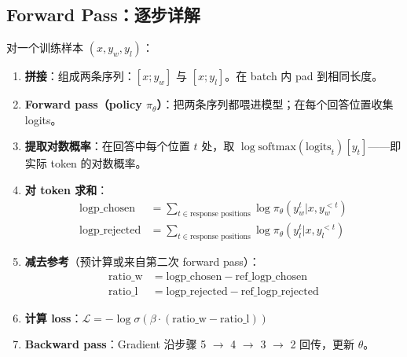 \subsection{Forward Pass：逐步详解}
\label{forward-pass-step-by-step}

对一个训练样本 $(x, y_w, y_l)$：

\begin{enumerate}
  \item \textbf{拼接}：组成两条序列：$[x; y_w]$ 与 $[x; y_l]$。在 batch 内 pad 到相同长度。
  \item \textbf{Forward pass（policy $\pi_\theta$）}：把两条序列都喂进模型；在每个回答位置收集 logits。
  \item \textbf{提取对数概率}：在回答中每个位置 $t$ 处，取 $\log\text{softmax}(\text{logits}_t)[y_t]$——即实际 token 的对数概率。
  \item \textbf{对 token 求和}：
\begin{align}
\text{logp\_chosen} &= \sum_{t \in \text{response positions}} \log\pi_\theta(y_w^t | x, y_w^{<t}) \\
\text{logp\_rejected} &= \sum_{t \in \text{response positions}} \log\pi_\theta(y_l^t | x, y_l^{<t})
\end{align}
  \item \textbf{减去参考}（预计算或来自第二次 forward pass）：
\begin{align}
\text{ratio\_w} &= \text{logp\_chosen} - \text{ref\_logp\_chosen} \\
\text{ratio\_l} &= \text{logp\_rejected} - \text{ref\_logp\_rejected}
\end{align}
  \item \textbf{计算 loss}：$\mathcal{L} = -\log\sigma(\beta \cdot (\text{ratio\_w} - \text{ratio\_l}))$
  \item \textbf{Backward pass}：Gradient 沿步骤 5 $\rightarrow$ 4 $\rightarrow$ 3 $\rightarrow$ 2 回传，更新 $\theta$。
\end{enumerate}

